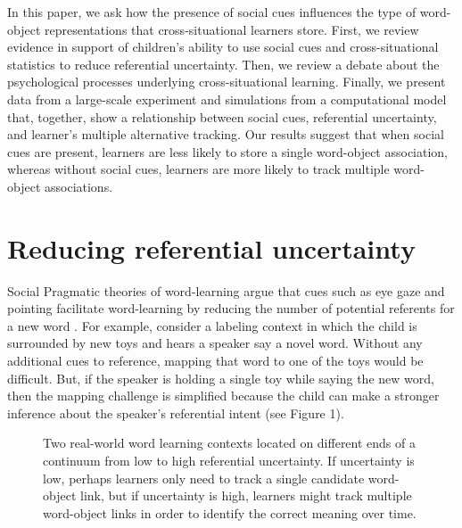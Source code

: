\documentclass[man]{apa2}
\begin{document}
In this paper, we ask how the presence of social cues influences the type of word-object representations that cross-situational learners store. First, we review evidence in support of children's ability to use social cues and cross-situational statistics to reduce referential uncertainty. Then, we review a debate about the psychological processes underlying cross-situational learning. Finally, we present data from a large-scale experiment and simulations from a computational model that, together, show a relationship between social cues, referential uncertainty, and learner's multiple alternative tracking. Our results suggest that when social cues are present, learners are less likely to store a single word-object association, whereas without social cues, learners are more likely to track multiple word-object associations.


\section{Reducing referential uncertainty}

Social Pragmatic theories of word-learning argue that cues such as eye gaze and pointing facilitate word-learning by reducing the number of potential referents for a new word \cite{bloom2002children, tomasello2009constructing}. For example, consider a labeling context in which the child is surrounded by new toys and hears a speaker say a novel word. Without any additional cues to reference, mapping that word to one of the toys would be difficult. But, if the speaker is holding a single toy while saying the new word, then the mapping challenge is simplified because the child can make a stronger inference about the speaker's referential intent (see Figure 1). 

%
\begin{figure}[H]
	\centering
	\caption{Two real-world word learning contexts located on different ends of a continuum from low to high referential uncertainty. If uncertainty is low, perhaps learners only need to track a single candidate word-object link, but if uncertainty is high, learners might track multiple word-object links in order to identify the correct meaning over time.}
\end{figure}
%
\newpage
\end{document}
